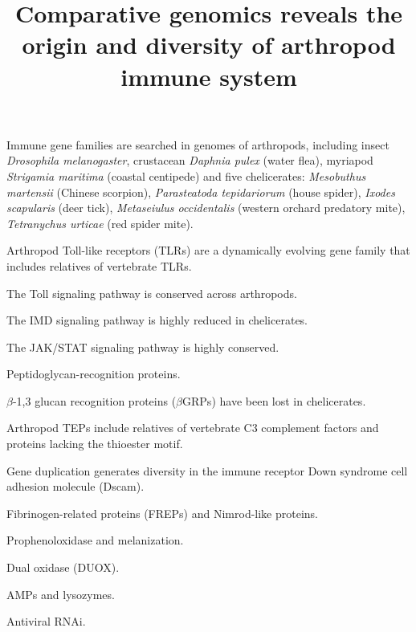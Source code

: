 \documentclass[11pt]{article}
\title{Comparative genomics reveals the origin and diversity of arthropod immune system}
\author{}
\date{}
\begin{document}
\begin{sloppypar}
  \maketitle

  \linenumbers

Immune gene families are searched in genomes of arthropods, including 
insect \textit{Drosophila melanogaster}, crustacean \textit{Daphnia pulex} (water flea), 
myriapod \textit{Strigamia maritima} (coastal centipede) and 
five chelicerates: \textit{Mesobuthus martensii} (Chinese scorpion), 
                   \textit{Parasteatoda tepidariorum} (house spider),
                   \textit{Ixodes scapularis} (deer tick),
                   \textit{Metaseiulus occidentalis} (western orchard predatory mite),
                   \textit{Tetranychus urticae} (red spider mite).

\par

Arthropod Toll-like receptors (TLRs) are a dynamically evolving gene family that includes relatives of vertebrate TLRs.

\par

The Toll signaling pathway is conserved across arthropods.

\par

The IMD signaling pathway is highly reduced in chelicerates.

\par

The JAK/STAT signaling pathway is highly conserved.

\par

Peptidoglycan-recognition proteins.

\par

$\beta$-1,3 glucan recognition proteins ($\beta$GRPs) have been lost in chelicerates.

\par

Arthropod TEPs include relatives of vertebrate C3 complement factors and proteins lacking the thioester motif.

\par

Gene duplication generates diversity in the immune receptor Down syndrome cell adhesion molecule (Dscam).

\par

Fibrinogen-related proteins (FREPs) and Nimrod-like proteins.

\par

Prophenoloxidase and melanization.

\par

Dual oxidase (DUOX).

\par

AMPs and lysozymes.

\par

Antiviral RNAi.

\end{sloppypar}
\end{document}
